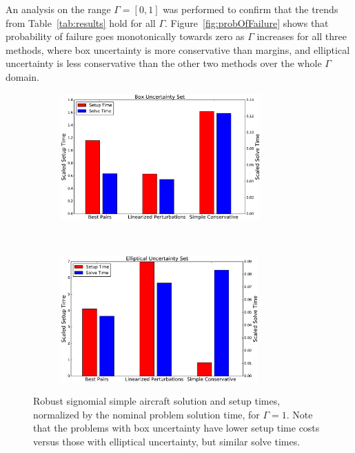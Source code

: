 An analysis on the range $\Gamma=[0,1]$ was performed to confirm that the trends from
Table~\ref{tab:results} hold for all $\Gamma$. Figure~\ref{fig:probOfFailure}
shows that probability of failure goes monotonically
towards zero as $\Gamma$ increases for all three methods, where box uncertainty is
more conservative than margins, and elliptical uncertainty is less conservative
than the other two methods over the whole $\Gamma$ domain.

\begin{figure}[h!]
    \centering
    \captionsetup{justification=centering, font=small}
    \begin{subfigure}{0.49\textwidth}
        \centering
        \includegraphics[height=1.9in]{signomial_simple_flight/box_sst.eps}
    \end{subfigure}
    ~
    \begin{subfigure}{0.49\textwidth}
        \centering
        \includegraphics[height=1.9in]{signomial_simple_flight/ell_sst.eps}
    \end{subfigure}
    \caption{Robust signomial simple aircraft solution and setup times, normalized by the
    nominal problem solution time, for $\Gamma = 1$.
    Note that the problems with box uncertainty have lower setup
    time costs versus those with elliptical uncertainty, but similar solve times.}
    \label{compare_signomial}
\end{figure}

